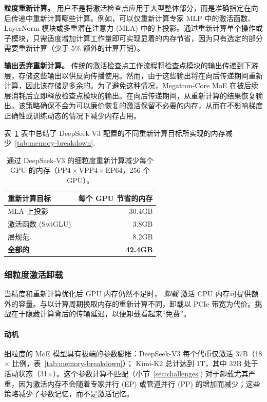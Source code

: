 \textbf{粒度重新计算。} 用户不是将激活检查点应用于大型整体部分，而是准确指定在向后传递中重新计算哪些计算。例如，可以仅重新计算专家 MLP 中的激活函数、LayerNorm 模块或多重潜在注意力 (MLA) 中的上投影。通过重新计算单个操作或子模块，只需适度增加计算工作量即可实现显着的内存节省，因为只有选定的部分需要重新计算（少于 5\% 额外的计算开销）。

\textbf{输出丢弃重新计算。} 传统的激活检查点工作流程将检查点模块的输出传递到下游层，存储这些输出以供反向传播使用。然而，由于这些输出将在向后传递期间重新计算，因此该存储是多余的。为了避免这种情况，Megatron-Core MoE 在被后续层消耗后立即释放检查点模块的输出。在向后传递期间，从重新计算的结果恢复输出。该策略确保不会为可以廉价恢复的激活保留不必要的内存，从而在不影响梯度正确性或训练动态的情况下减少内存占用。

表~\ref{tab:recomputation-savings} 表中总结了 DeepSeek-V3 配置的不同重新计算目标所实现的内存减少~\ref{tab:memory-breakdown}.

\begin{table}[ht]
\centering
\caption{通过 DeepSeek-V3 的细粒度重新计算减少每个 GPU 的内存（$\text{PP}4 \times \text{VPP}4 \times \text{EP}64$，256 个 GPU）。}
\label{tab:recomputation-savings}
\begin{tabular}{lr}
\toprule
\textbf{重新计算目标} & \textbf{每个 GPU 节省的内存} \\
\midrule
MLA 上投影 & 30.4GB \\
激活函数 (SwiGLU) & 3.8GB \\
层规范 & 8.2GB \\
\midrule
\textbf{全部的} & \textbf{42.4GB} \\
\bottomrule
\end{tabular}
\end{table}

\subsubsection{细粒度激活卸载}\label{sec:offloading}

当精度和重新计算优化后 GPU 内存仍然不足时， \textit{卸载} 激活 CPU 内存可提供额外的容量。与以计算周期换取内存的重新计算不同，卸载以 PCIe 带宽为代价。挑战在于隐藏计算背后的传输延迟，以便卸载看起来“免费”。

\paragraph{动机}
细粒度的 MoE 模型具有极端的参数膨胀：DeepSeek-V3 每个代币仅激活 37B（18$\times$ 比例，表~\ref{tab:memory-breakdown}）； Kimi-K2 总计达到 1T，其中 32B 处于活动状态（31$\times$）。这个参数计算不匹配（小节~\ref{sec:challenges}) 对于卸载尤其严重，因为激活内存不会随着专家并行 (EP) 或管道并行 (PP) 的增加而减少；这些策略减少了参数记忆，而不是激活记忆。

